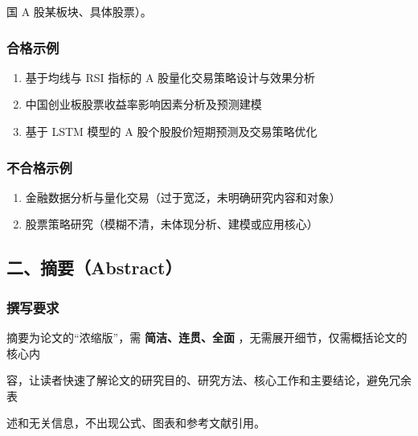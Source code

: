\documentclass[
]{article}
\begin{document}
国 A 股某板块、具体股票）。

\hypertarget{ux5408ux683cux793aux4f8b}{%
\subsubsection{\texorpdfstring{\textbf{合格示例}}{合格示例}}\label{ux5408ux683cux793aux4f8b}}

\begin{enumerate}
\def\labelenumi{\arabic{enumi}.}
\item
  基于均线与 RSI 指标的 A 股量化交易策略设计与效果分析
\item
  中国创业板股票收益率影响因素分析及预测建模
\item
  基于 LSTM 模型的 A 股个股股价短期预测及交易策略优化
\end{enumerate}

\hypertarget{ux4e0dux5408ux683cux793aux4f8b}{%
\subsubsection{\texorpdfstring{\textbf{不合格示例}}{不合格示例}}\label{ux4e0dux5408ux683cux793aux4f8b}}

\begin{enumerate}
\def\labelenumi{\arabic{enumi}.}
\item
  金融数据分析与量化交易（过于宽泛，未明确研究内容和对象）
\item
  股票策略研究（模糊不清，未体现分析、建模或应用核心）
\end{enumerate}

\hypertarget{ux4e8cux6458ux8981abstract}{%
\subsection{\texorpdfstring{\textbf{二、摘要（Abstract）}}{二、摘要（Abstract）}}\label{ux4e8cux6458ux8981abstract}}

\hypertarget{ux64b0ux5199ux8981ux6c42-1}{%
\subsubsection{\texorpdfstring{\textbf{撰写要求}}{撰写要求}}\label{ux64b0ux5199ux8981ux6c42-1}}

摘要为论文的``浓缩版''，需 \textbf{简洁、连贯、全面}
，无需展开细节，仅需概括论文的核心内

容，让读者快速了解论文的研究目的、研究方法、核心工作和主要结论，避免冗余表

述和无关信息，不出现公式、图表和参考文献引用。
\end{document}
